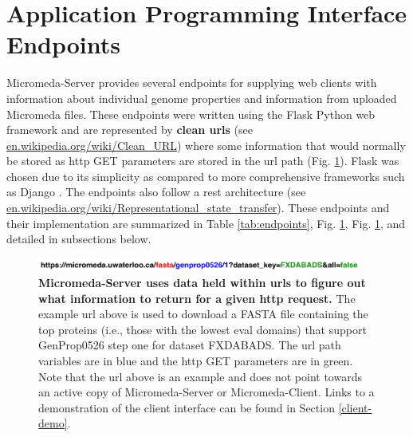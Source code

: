 \section{Application Programming Interface Endpoints} \label{endpoints}

Micromeda-Server provides several endpoints for supplying web clients with information about individual genome properties and information from uploaded Micromeda files. These endpoints were written using the Flask Python web framework \cite{grinberg2018flask} and are represented by \textbf{clean \gls{url}s} (see \href{http://en.wikipedia.org/wiki/Clean_URL}{en.wikipedia.org/wiki/Clean\_URL}) where some information that would normally be stored as \gls{http} GET parameters are stored in the \gls{url} path (Fig. \ref{fig:endpoint-url}). Flask was chosen due to its simplicity as compared to more comprehensive frameworks such as Django \cite{holovaty2009definitive}. The endpoints also follow a \gls{rest} architecture \cite{fielding2000representational} (see \href{http://en.wikipedia.org/wiki/Representational_state_transfer}{en.wikipedia.org/wiki/Representational\_state\_transfer}). These endpoints and their implementation are summarized in Table \ref{tab:endpoints}, Fig. \ref{endpoints}, Fig. \ref{fig:endpoint-url}, and detailed in subsections below.

\begin{figure}[!ht]
  \centering
	\includegraphics[width=0.95\textwidth]{media/Coloured-Endpoint.pdf}
	 \caption[Micromeda-Server uses data held within URLs to figure out what information to return for a given HTTP request.]{\textbf{Micromeda-Server uses data held within \gls{url}s to figure out what information to return for a given \gls{http} request.} The example \gls{url} above is used to download a FASTA file containing the top proteins (i.e., those with the lowest \gls{eval} domains) that support GenProp0526 step one for dataset FXDABADS. The \gls{url} path variables are in blue and the \gls{http} GET parameters are in green. Note that the \gls{url} above is an example and does not point towards an active copy of Micromeda-Server or Micromeda-Client. Links to a demonstration of the client interface can be found in Section \ref{client-demo}.}
	 \label{fig:endpoint-url}
\end{figure}

